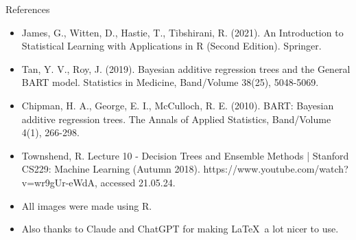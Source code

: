 \documentclass[10pt]{beamer}
\begin{document}
\begin{frame}{References}
    \begin{itemize}
        \item James, G., Witten, D., Hastie, T., Tibshirani, R. (2021). An Introduction to Statistical Learning with Applications in R (Second Edition). Springer.
        \item Tan, Y. V., Roy, J. (2019). Bayesian additive regression trees and the General BART model. Statistics in Medicine, Band/Volume 38(25), 5048-5069.
        \item Chipman, H. A., George, E. I., McCulloch, R. E. (2010). BART: Bayesian additive regression trees. The Annals of Applied Statistics, Band/Volume 4(1), 266-298.
        \item Townshend, R. Lecture 10 - Decision Trees and Ensemble Methods | Stanford CS229: Machine Learning (Autumn 2018). https://www.youtube.com/watch?v=wr9gUr-eWdA, accessed 21.05.24.
              \vspace{0.5cm}

        \item All images were made using R.
        \item Also thanks to Claude and ChatGPT for making \LaTeX\ a lot nicer to use.
    \end{itemize}
\end{frame}
\end{document}
